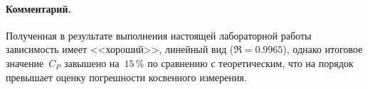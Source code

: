 \documentclass{urticle}
\begin{document}
\paragraph{Комментарий.} Полученная в результате выполнения настоящей лабораторной работы зависимость имеет <<хороший>>, линейный вид ($\mathfrak{R} = 0.9965$), однако итоговое
значение~$C_P$ завышено на~$15\,\%$ по сравнению с теоретическим, что на порядок превышает
оценку погрешности косвенного измерения.

\end{document}
